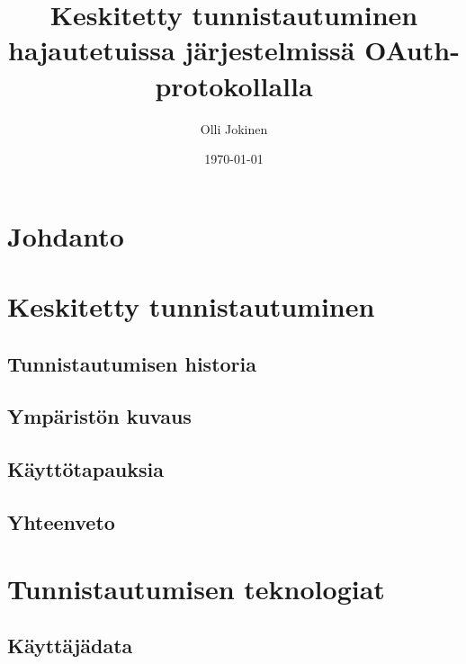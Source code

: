 \documentclass{tktltiki}
\begin{document}
\title{Keskitetty tunnistautuminen hajautetuissa järjestelmissä OAuth-protokollalla}
\author{Olli Jokinen}
\date{\today}
\maketitle
\doublespacing
{}
\subject{Tietojenkäsittelytiede}
\additionalinformation{}
\begin{abstract}

\end{abstract}
\mytableofcontents
\section{Johdanto}

\section{Keskitetty tunnistautuminen}

\subsection{Tunnistautumisen historia}

\subsection{Ympäristön kuvaus}

\subsection{Käyttötapauksia}

\subsection{Yhteenveto}

\section{Tunnistautumisen teknologiat}

\subsection{Käyttäjädata}

\end{document}
